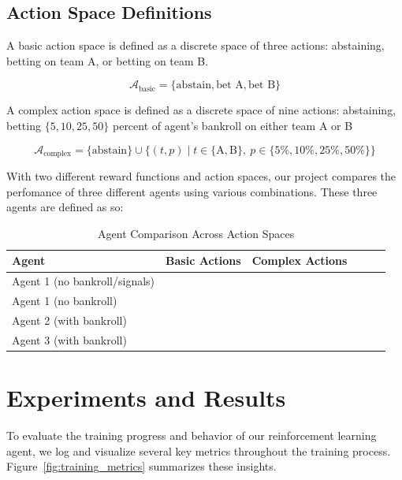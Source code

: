 \documentclass[sigconf]{acmart}
\newcommand{\cmark}{\ding{51}}  %
\begin{document}
\subsection{Action Space Definitions}

A basic action space is defined as a discrete space of three actions: abstaining, betting on team A, or betting on team B.

\begin{equation}
\mathcal{A}_{\text{basic}} = \{\text{abstain}, \text{bet A}, \text{bet B} \}
\end{equation}

A complex action space is defined as a discrete space of nine actions: abstaining, betting $\{5, 10, 25, 50\}$ percent of agent's bankroll on either team A or B

\begin{equation}
\mathcal{A}_{\text{complex}} = \{\text{abstain}\} \cup \{(t, p) \mid t \in \{\text{A}, \text{B}\},\ p \in \{5\%, 10\%, 25\%, 50\%\} \}
\end{equation}

With two different reward functions and action spaces, our project compares the perfomance of three different agents using various combinations. These three agents are defined as so: 


\begin{table}[h]
  \caption{Agent Comparison Across Action Spaces}
  \label{tab:agent_benchmarks}
  \begin{tabular}{lccccc}
    \toprule
    \textbf{Agent} & \textbf{Basic Actions} & \textbf{Complex Actions} \\
    \midrule
    Agent 1 (no bankroll/signals)     & \cmark  &         \\
    Agent 1 (no bankroll)               & \cmark  &         \\
    Agent 2 (with bankroll)             & \cmark  &         \\
    Agent 3 (with bankroll)             &         & \cmark  \\
    \bottomrule
  \end{tabular}
\end{table}

\bigskip
\section{Experiments and Results}

To evaluate the training progress and behavior of our reinforcement learning agent, we log and visualize several key metrics throughout the training process. Figure~\ref{fig:training_metrics} summarizes these insights.
\end{document}
